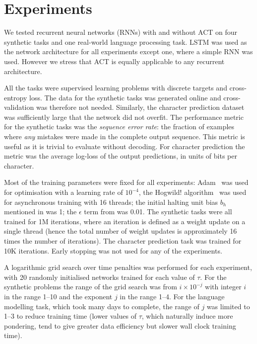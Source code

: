 \documentclass[10pt]{article}
\newcommand{\seclabel}[1]{\label{sec:#1}}
\newcommand{\eref}[1]{\Cref{eq:#1}}
\begin{document}
\section{Experiments}\seclabel{results}
We tested recurrent neural networks (RNNs) with and without ACT on four synthetic tasks and one real-world language processing task.
LSTM was used as the network architecture for all experiments except one, where a simple RNN was used.
However we stress that ACT is equally applicable to any recurrent architecture.

All the tasks were supervised learning problems with discrete targets and cross-entropy loss.
The data for the synthetic tasks was generated online and cross-validation was therefore not needed.
Similarly, the character prediction dataset was sufficiently large that the network did not overfit.
The performance metric for the synthetic tasks was the \emph{sequence error rate}: the fraction of examples where \emph{any} mistakes were made in the complete output sequence.
This metric is useful as it is trivial to evaluate without decoding. 
For character prediction the metric was the average log-loss of the output predictions, in units of bits per character.

Most of the training parameters were fixed for all experiments: Adam~\cite{kingma2014adam} was used for optimisation with a learning rate of $10^{-4}$, the Hogwild! algorithm~\cite{recht2011hogwild} was used for asynchronous training with 16 threads; the initial halting unit bias $b_h$ mentioned in \eref{halting_act} was 1; the $\epsilon$ term from \eref{epsilon} was 0.01.
The synthetic tasks were all trained for 1M iterations, where an iteration is defined as a weight update on a single thread (hence the total number of weight updates is approximately 16 times the number of iterations).
The character prediction task was trained for 10K iterations. 
Early stopping was not used for any of the experiments.

A logarithmic grid search over time penalties was performed for each experiment, with 20 randomly initialised networks trained for each value of $\tau$.
For the synthetic problems the range of the grid search was from $i \times 10^{-j}$ with integer $i$ in the range 1--10 and the exponent $j$ in the range 1--4.
For the language modelling task, which took many days to complete, the range of $j$ was limited to 1--3 to reduce training time (lower values of $\tau$, which naturally induce more pondering, tend to give greater data efficiency but slower wall clock training time).
\end{document}
